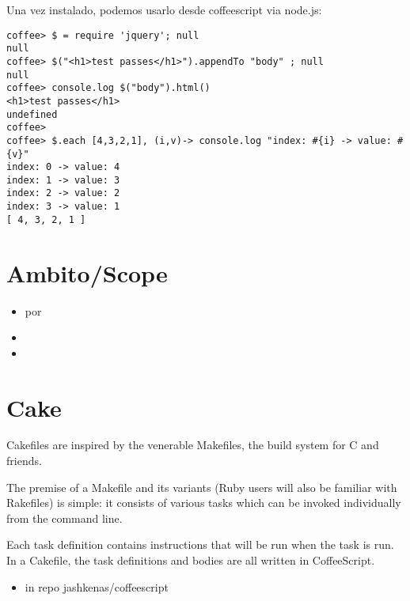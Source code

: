 Una vez instalado, podemos usarlo desde coffeescript via node.js:
\begin{verbatim}
coffee> $ = require 'jquery'; null
null
coffee> $("<h1>test passes</h1>").appendTo "body" ; null
null
coffee> console.log $("body").html() 
<h1>test passes</h1>
undefined
coffee> 
coffee> $.each [4,3,2,1], (i,v)-> console.log "index: #{i} -> value: #{v}"
index: 0 -> value: 4
index: 1 -> value: 3
index: 2 -> value: 2
index: 3 -> value: 1
[ 4, 3, 2, 1 ]
\end{verbatim}

\section{Ambito/Scope}

\begin{itemize}
\item
{} por 

\item
{}
\item
{}
\end{itemize}

\section{Cake}

Cakefiles are inspired by the venerable Makefiles, the build system for
C and friends. 

The premise of a Makefile and its variants (Ruby users will also be familiar with Rakefiles) is simple: it consists of various tasks which can be invoked individually from the command line. 

Each task definition contains instructions that will be run when the task is run. In a Cakefile, the task definitions and bodies are all written in CoffeeScript.


\begin{itemize}
\item
{}
in repo jashkenas/coffeescript
\end{itemize}

